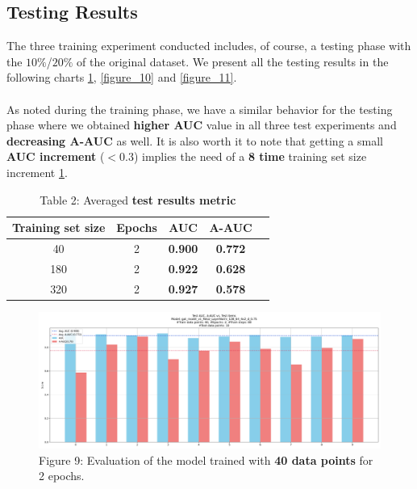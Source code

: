 \documentclass[11pt]{article}
\begin{document}
	
	\clearpage
	\subsection{Testing Results}
	The three training experiment conducted includes, of course, a testing phase with the $10\%$/$20\%$ of the original dataset.
	We present all the testing results in the following charts \ref{figure_9}, \ref{figure_10} and \ref{figure_11}. \\\\
	As noted during the training phase, we have a similar behavior for the testing phase where we obtained \textbf{higher AUC} value in all three test experiments and \textbf{decreasing A-AUC} as well. It is also worth it to note that getting a small \textbf{AUC increment} ($<0.3$) implies the need of a \textbf{8 time} training set size increment \ref{table_2}. 
	
	\begin{table}[h!]
		\centering
		\begin{tabular}{ccccc}
			\toprule
			Training set size & Epochs & \textbf{AUC} & \textbf{A-AUC} \\
			\midrule
			40  & 2 & \textbf{0.900} & \textbf{0.772} \\
			180 & 2 & \textbf{0.922} & \textbf{0.628} \\
			320 & 2 & \textbf{0.927} & \textbf{0.578} \\
			\bottomrule
		\end{tabular}
		\caption{Table 2: Averaged \textbf{test results metric}}
		\label{table_2}
	\end{table}
	
	\begin{figure}[h!] %
		\centering
		\includegraphics[width=1\textwidth]{images/test_auc_10_gat_model_v1_ReLU_LayerNorm_128_64_4x2_d_0.75_40_2_20250202-144028.jpg}
		\caption{Figure 9: Evaluation of the model trained with \textbf{40 data points} for 2 epochs.}
		\label{figure_9}
	\end{figure}
	
\end{document}
